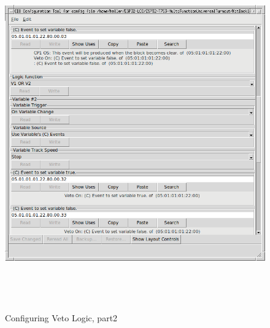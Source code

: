 \documentclass[12pt,twoside]{article}
\begin{document}
\begin{figure}[hbpt]\begin{centering}%
\includegraphics[height=6in]{ExampleSidingCP1-ConfigVetoLogic1b.png}
\caption{Configuring Veto Logic, part2}
\label{fig:ExampleSidingCP1-ConfigVetoLogic1b}
\end{centering}\end{figure}
\end{document}
